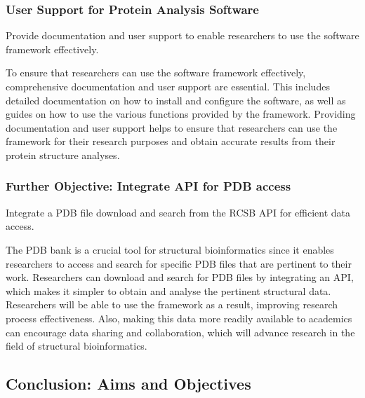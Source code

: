 \documentclass[]{final_report}
\begin{document}
\subsubsection{User Support for Protein Analysis Software}

\begin{displayquote}
    Provide documentation and user support to enable researchers to use the software framework effectively.
\end{displayquote}

To ensure that researchers can use the software framework effectively, comprehensive documentation and user support are essential. This includes detailed documentation on how to install and configure the software, as well as guides on how to use the various functions provided by the framework. Providing documentation and user support helps to ensure that researchers can use the framework for their research purposes and obtain accurate results from their protein structure analyses.

\subsubsection{Further Objective: Integrate API for PDB access}

\begin{displayquote}
    Integrate a PDB file download and search from the RCSB API for efficient data access.
\end{displayquote}

The PDB bank is a crucial tool for structural bioinformatics since it enables researchers to access and search for specific PDB files that are pertinent to their work. Researchers can download and search for PDB files by integrating an API, which makes it simpler to obtain and analyse the pertinent structural data. Researchers will be able to use the framework as a result, improving research process effectiveness. Also, making this data more readily available to academics can encourage data sharing and collaboration, which will advance research in the field of structural bioinformatics.

\clearpage

\subsection{Conclusion: Aims and Objectives}
\end{document}
